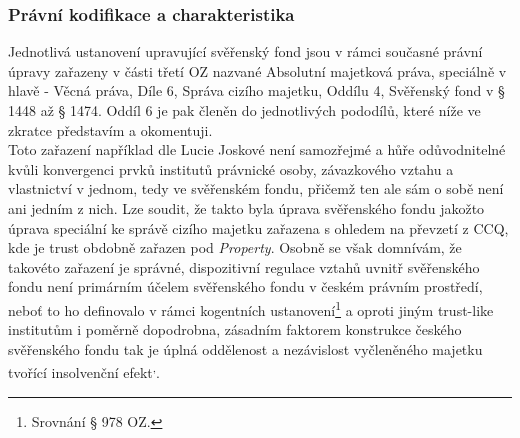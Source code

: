 \documentclass{article}
\begin{document}

\subsubsection{Právní kodifikace a charakteristika}

Jednotlivá ustanovení upravující svěřenský fond jsou v rámci současné právní úpravy zařazeny v části třetí OZ nazvané Absolutní majetková práva, speciálně v hlavě  \MakeUppercase{{}} - Věcná práva, Díle 6, Správa cizího majetku, Oddílu 4, Svěřenský fond v § 1448 až § 1474. Oddíl 6 je pak členěn do jednotlivých pododílů, které níže ve zkratce představím a okomentuji. \\

Toto zařazení například dle Lucie Joskové není samozřejmé a hůře odůvodnitelné kvůli konvergenci prvků institutů právnické osoby, závazkového vztahu a vlastnictví v jednom, tedy ve svěřenském fondu, přičemž ten ale sám o sobě není ani jedním z nich. Lze soudit, že takto byla úprava svěřenského fondu jakožto úprava speciální ke správě cizího majetku zařazena s ohledem na převzetí z CCQ, kde je trust obdobně zařazen pod \textit{Property}. Osobně se však domnívám, že takovéto zařazení je správné, dispozitivní regulace vztahů uvnitř svěřenského fondu není primárním účelem svěřenského fondu v českém právním prostředí, neboť to ho definovalo v rámci kogentních ustanovení\footnote{Srovnání § 978 OZ.} a oproti jiným trust-like institutům i poměrně dopodrobna, zásadním faktorem konstrukce českého svěřenského fondu tak je úplná oddělenost a nezávislost vyčleněného majetku tvořící insolvenční efekt\textsuperscript{,}.\\


\end{document}
